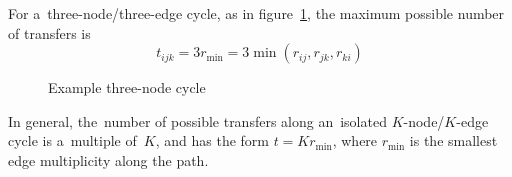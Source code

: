 \documentclass[paper=a4,parskip=half,DIV=12]{leetcode}
\begin{document}
For a~three-node/three-edge cycle, as in figure~\ref{fig:U5GUM}, the maximum
possible number of transfers is
\begin{equation}
  t_{ijk} = 3 r_{\min} = 3 \min{(r_{ij}, r_{jk}, r_{ki})}
 \label{eq:S95QR}
\end{equation}
\begin{figure}[htbp]
  \centering
  \caption{Example three-node cycle}
  \label{fig:U5GUM}
\end{figure}

In general, the~number of possible transfers along an~isolated
$K$-node/$K$-edge cycle is a~multiple of~$K$, and has the form
$t = K r_{\min}$, where $r_{\min}$ is the smallest edge multiplicity along the
path.

\end{document}
